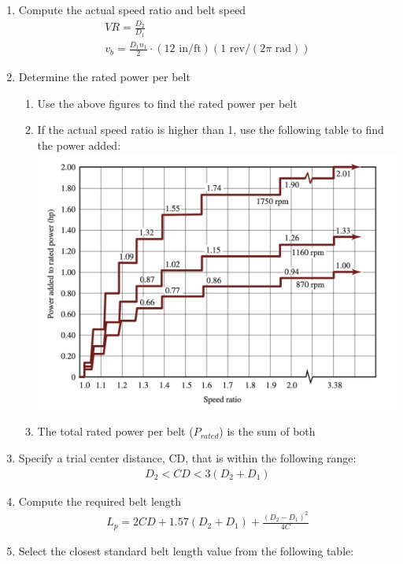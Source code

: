 \documentclass[11pt, fleqn]{article}
\begin{document}
\begin{enumerate}
    \item Compute the actual speed ratio and belt speed
    \begin{align*}
        VR=\frac{D_2}{D_1}\\
        v_b=\frac{D_1n_1}{2}\cdot(12 \text{ in/ft})(1 \text{ rev/}(2\pi\text{ rad}))
    \end{align*}
    \item Determine the rated power per belt
    \begin{enumerate}
        \item Use the above figures to find the rated power per belt
        \item If the actual speed ratio is higher than 1, use the following table to find the power added:\\
        \includegraphics[scale=0.3]{Belts/7-17.png}
        \item The total rated power per belt ($P_{rated}$) is the sum of both
    \end{enumerate}
    \item Specify a trial center distance, CD, that is within the following range:
    \begin{align*}
        D_2 < CD < 3(D_2+D_1)
    \end{align*}
    \item Compute the required belt length
    \begin{align*}
        L_p=2CD+1.57(D_2+D_1)+\frac{(D_2-D_1)^2}{4C}
    \end{align*}
    \item Select the closest standard belt length value from the following table:\\

\end{enumerate}
\end{document}
